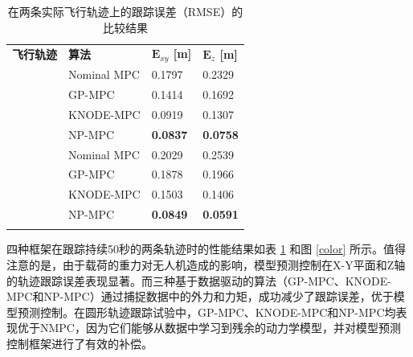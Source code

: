 \documentclass[lang=chs, degree=master, blindreview=false, winfonts=true]{yanputhesis}
\begin{document}
\renewcommand\arraystretch{1.15}
\begin{table}[htb!]
    \centering
    \caption{在两条实际飞行轨迹上的跟踪误差（RMSE）的比较结果}
    \label{table_xyz}
    \renewcommand\arraystretch{1.5} %
    \begin{tabular}{m{2.2cm}<{\centering} m{2.5cm}<{\centering} m{2.2cm}<{\centering} m{2.2cm}<{\centering}}
        \Xhline{1.pt}
        \textbf{飞行轨迹} & \textbf{算法} & \textbf{$\bm E_{xy}$ [m]} & \textbf{$\bm E_z$ [m]} \\
        \Xhline{1.pt}
        & Nominal MPC & 0.1797 & 0.2329 \\
        \multirow{2}{2.2cm}{\centering {圆}} & GP-MPC & 0.1414 & 0.1692 \\
        & KNODE-MPC & {0.0919} & {0.1307} \\
        & NP-MPC & \textbf{0.0837} & \textbf{0.0758} \\
        \hline
        & Nominal MPC & 0.2029 & 0.2539 \\
        \multirow{2}{2.2cm}{\centering {双纽线}} & GP-MPC & 0.1878 & 0.1966 \\
        & KNODE-MPC & {0.1503} & {0.1406} \\
        & NP-MPC & \textbf{0.0849} & \textbf{0.0591} \\
        \hline
        \Xhline{1.pt}
    \end{tabular}    
\end{table}

四种框架在跟踪持续50秒的两条轨迹时的性能结果如表 \ref{table_xyz} 和图 \ref{color} 所示。值得注意的是，由于载荷的重力对无人机造成的影响，模型预测控制在X-Y平面和Z轴的轨迹跟踪误差表现显著。而三种基于数据驱动的算法（GP-MPC、KNODE-MPC和NP-MPC）通过捕捉数据中的外力和力矩，成功减少了跟踪误差，优于模型预测控制。在圆形轨迹跟踪试验中，GP-MPC、KNODE-MPC和NP-MPC均表现优于NMPC，因为它们能够从数据中学习到残余的动力学模型，并对模型预测控制框架进行了有效的补偿。
\end{document}
